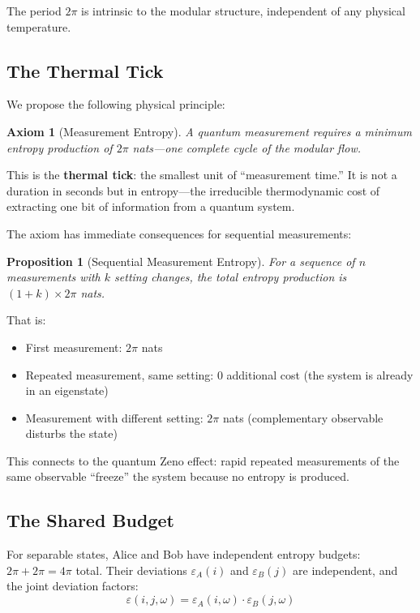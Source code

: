 \documentclass[12pt,a4paper]{article}
\newtheorem{proposition}[theorem]{Proposition}
\newtheorem{axiom}{Axiom}
\newcommand{\eps}{\varepsilon}
\begin{document}
The period $2\pi$ is intrinsic to the modular structure, independent of any physical temperature.

\subsection{The Thermal Tick}

We propose the following physical principle:

\begin{axiom}[Measurement Entropy]
A quantum measurement requires a minimum entropy production of $2\pi$ nats—one complete cycle of the modular flow.
\end{axiom}

This is the \textbf{thermal tick}: the smallest unit of ``measurement time.'' It is not a duration in seconds but in entropy—the irreducible thermodynamic cost of extracting one bit of information from a quantum system.

The axiom has immediate consequences for sequential measurements:

\begin{proposition}[Sequential Measurement Entropy]
For a sequence of $n$ measurements with $k$ setting changes, the total entropy production is $(1 + k) \times 2\pi$ nats.
\end{proposition}

That is:
\begin{itemize}
\item First measurement: $2\pi$ nats
\item Repeated measurement, same setting: $0$ additional cost (the system is already in an eigenstate)
\item Measurement with different setting: $2\pi$ nats (complementary observable disturbs the state)
\end{itemize}

This connects to the quantum Zeno effect: rapid repeated measurements of the same observable ``freeze'' the system because no entropy is produced.

\subsection{The Shared Budget}

For separable states, Alice and Bob have independent entropy budgets: $2\pi + 2\pi = 4\pi$ total. Their deviations $\eps_A(i)$ and $\eps_B(j)$ are independent, and the joint deviation factors:
\begin{equation}
\eps(i,j,\omega) = \eps_A(i,\omega) \cdot \eps_B(j,\omega)
\end{equation}
\end{document}
